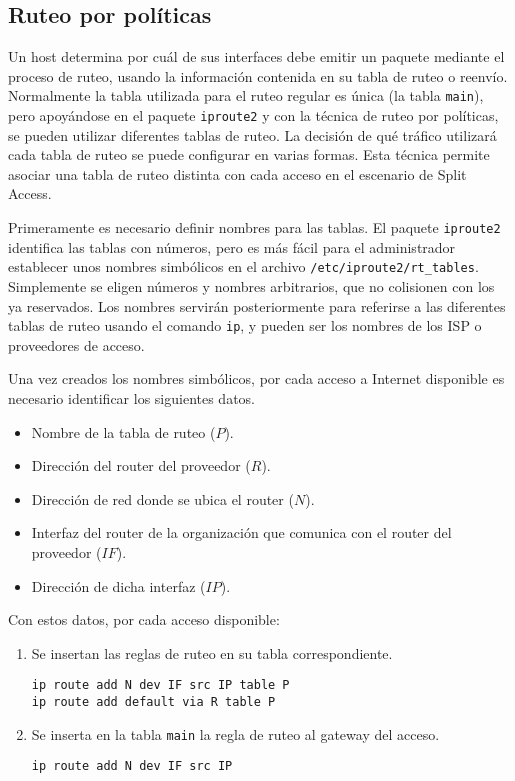  

\subsection{Ruteo por políticas}
Un host determina por cuál de sus interfaces debe emitir un paquete mediante el proceso de ruteo, usando la información contenida en su tabla de ruteo o reenvío. Normalmente la tabla utilizada para el ruteo regular es única (la tabla \texttt{main}), pero apoyándose en el paquete \texttt{iproute2} y con la técnica de ruteo por políticas, se pueden utilizar diferentes tablas de ruteo. La decisión de qué tráfico utilizará cada tabla de ruteo se puede configurar en varias formas. Esta técnica permite asociar una tabla de ruteo distinta con cada acceso en el escenario de Split Access.

Primeramente es necesario definir nombres para las tablas. El paquete \texttt{iproute2} identifica las tablas con números, pero es más fácil para el administrador establecer unos nombres simbólicos en el archivo \texttt{/etc/iproute2/rt\_tables}. Simplemente se eligen números y nombres arbitrarios, que no colisionen con los ya reservados. Los nombres servirán posteriormente para referirse a las diferentes tablas de ruteo usando el comando \texttt{ip}, y pueden ser los nombres de los ISP o proveedores de acceso.

Una vez creados los nombres simbólicos, por cada acceso a Internet disponible es necesario identificar los siguientes datos.
\begin{itemize}
	\item Nombre de la tabla de ruteo ($P$).
	\item Dirección del router del proveedor ($R$).
	\item Dirección de red donde se ubica el router ($N$).
	\item Interfaz del router de la organización que comunica con el router del proveedor ($IF$).
	\item Dirección de dicha interfaz ($IP$).
\end{itemize}

Con estos datos, por cada acceso disponible:
\begin{enumerate}
	\item Se insertan las reglas de ruteo en su tabla correspondiente. 
\begin{lstlisting}
ip route add N dev IF src IP table P
ip route add default via R table P
\end{lstlisting}
	\item Se inserta en la tabla \texttt{main} la regla de ruteo al gateway del acceso.
	\begin{lstlisting}
ip route add N dev IF src IP
\end{lstlisting}
\end{enumerate} 

